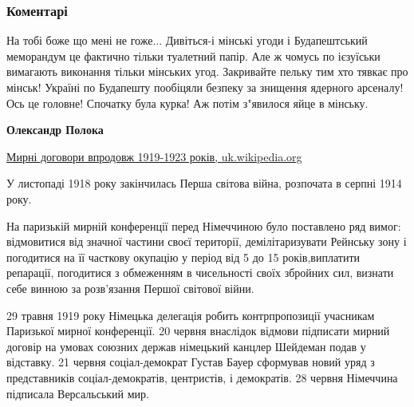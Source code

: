  
 
 
 
 
\subsubsection{Коментарі}
\label{sec:08_12_2021.fb.jarosh_dmitrij.1.minsk_domovlenosti_getj.cmt}

\begin{itemize} %

На тобі боже що мені не гоже... Дивіться-і мінські угоди і Будапештський
меморандум це фактично тільки туалетний папір. Але ж чомусь по ієзуїськи
вимагають виконання тільки мінських угод. Закривайте пельку тим хто тявкає про
мінськ! Україні по Будапешту пообіцяли безпеку за знищення ядерного арсеналу! Ось
це головне! Спочатку була курка! Аж потім з"явилося яйце в мінську.

\begin{itemize} %
\textbf{Олександр Полока}

\href{https://uk.wikipedia.org/wiki/Мирні_договори_впродовж_1919-1923_років}{%
Мирні договори впродовж 1919-1923 років, uk.wikipedia.org%
}

\begin{multicols}{2}

У листопаді 1918 року закінчилась Перша світова війна, розпочата в серпні 1914
року.

На паризькій мирній конференції перед Німеччиною було поставлено ряд вимог:
відмовитися від значної частини своєї території, демілітаризувати Рейнську зону
і погодитися на її часткову окупацію у період від 5 до 15 років,виплатити
репарації, погодитися з обмеженням в чисельності своїх збройних сил, визнати
себе винною за розв'язання Першої світової війни.

29 травня 1919 року Німецька делегація робить контрпропозиції учасникам
Паризької мирної конференції. 20 червня внаслідок відмови підписати мирний
договір на умовах союзних держав німецький канцлер Шейдеман подав у відставку.
21 червня соціал-демократ Густав Бауер сформував новий уряд з представників
соціал-демократів, центристів, і демократів. 28 червня Німеччина підписала
Версальський мир.


\end{multicols}
\end{itemize}
\end{itemize}
